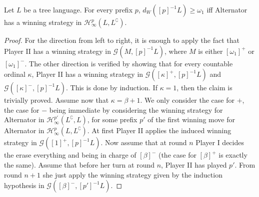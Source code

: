 \begin{proposition}\label{prop:infinity} Let $L$ be a tree language. For every prefix $p$,
$d_W([p]^{-1}L) \geq \omega_1$ iff Alternator has a winning strategy in $\mathcal{H}^p_\infty(L, L^\complement)$. 

\end{proposition}
\begin{proof}
For the direction from left to right, it is enough to apply the fact that %
Player II has a winning strategy in $\mathcal{G}(M, [p]^{-1}L)$, where $M$ is either $[\omega_1]^+$ or $[\omega_1]^-$. 
%
The other direction is verified by showing that for every countable ordinal $\kappa$, Player II has a winning strategy in $\mathcal{G}([\kappa]^+, [p]^{-1}L)$ and $\mathcal{G}([\kappa]^-, [p]^{-1}L)$.
This is done by induction. %
If $\kappa=1$, then the claim is trivially proved.
Assume now that $\kappa= \beta + 1$. We only consider the case for $+$, the case for $-$ being immediate  by considering the winning strategy for Alternator in $\mathcal{H}^{p'}_\infty(L^\complement, L)$, for some prefix $p'$ of the first winning move for Alternator in $\mathcal{H}^p_\infty(L, L^\complement)$. At first Player II applies the induced winning strategy in $\mathcal{G}([1]^+, [p]^{-1}L)$. Now assume that at round $n$ Player I decides the erase everything and being in charge of $[\beta]^-$ (the case for $[\beta]^+$ is exactly the same). Assume that before her turn at round $n$, Player II has played $p'$. From round $n+1$ she just apply the winning strategy given by the induction hypothesis in $\mathcal{G}([\beta]^-, [p']^{-1}L)$. 

\end{proof}
